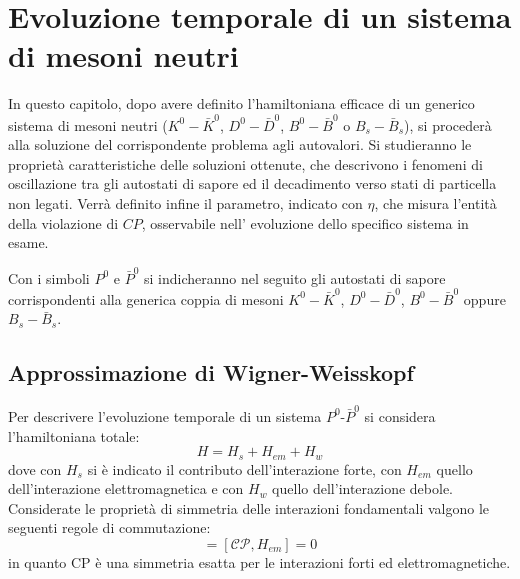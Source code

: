 
\chapter{Evoluzione temporale di un sistema di mesoni neutri}
\noindent
In questo capitolo, dopo avere definito l'hamiltoniana efficace di un generico sistema di mesoni neutri ($K^0-\bar{K}^0$, $D^0-\bar{D}^0$, $B^0-\bar{B}^0$ o 
$B_s-\bar{B}_s$), 
si procederà alla soluzione del corrispondente problema agli autovalori.  Si studieranno le proprietà caratteristiche delle soluzioni ottenute, che descrivono i 
 fenomeni di oscillazione tra gli autostati di sapore ed il decadimento verso stati di particella non legati. Verrà definito infine il parametro, indicato 
con $\eta$, che misura l'entit\`a della violazione di $CP$, osservabile nell' evoluzione dello specifico sistema in esame.

Con i simboli $P^0$ e $\bar{P}^0$ si indicheranno nel seguito gli autostati di sapore corrispondenti alla generica coppia di mesoni $K^0-\bar{K}^0$, $D^0-\bar{D}^0$, $B^0-\bar{B}^0$ oppure $B_s-\bar{B}_s$.
%
%
\section{Approssimazione di Wigner-Weisskopf}
\noindent
Per descrivere l'evoluzione temporale di un sistema $P^0$-$\bar{P}^0$ si considera l'hamiltoniana totale:
\begin{equation}
 H = H_s + H_{em} + H_w
\end{equation}
dove con $H_s$ si è indicato il contributo dell'interazione forte, con $H_{em}$ quello dell'interazione elettromagnetica e con $H_w$ quello dell'interazione debole.
Considerate le proprietà di simmetria delle interazioni fondamentali valgono le seguenti regole di commutazione:
\begin{equation}
 [\mathscr{C}\mathscr{P},H_s] = [\mathscr{C}\mathscr{P},H_{em}] = 0
\end{equation}
in quanto CP è una simmetria esatta per le interazioni forti ed elettromagnetiche.

